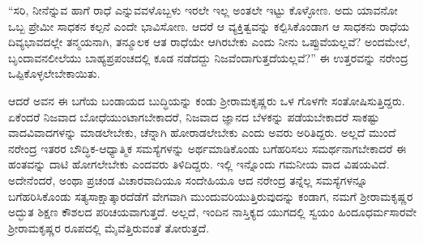 “ಸರಿ, ನೀನೆನ್ನುವ ಹಾಗೆ ರಾಧೆ ಎನ್ನುವವಳೊಬ್ಬಳು ಇರಲೇ ಇಲ್ಲ ಅಂತಲೇ ಇಟ್ಟು ಕೊಳ್ಳೋಣ. ಅದು ಯಾವನೋ ಒಬ್ಬ ಪ್ರೇಮೀ ಸಾಧಕನ ಕಲ್ಪನೆ ಎಂದೇ ಭಾವಿಸೋಣ. ಆದರೆ ಆ ವ್ಯಕ್ತಿತ್ವವನ್ನು ಕಲ್ಪಿಸಿಕೊಂಡಾಗ ಆ ಸಾಧಕನು ರಾಧೆಯ ದಿವ್ಯಭಾವದಲ್ಲೇ ತನ್ಮಯನಾಗಿ, ತನ್ಮೂಲಕ ಆತ ರಾಧೆಯೇ ಆಗಿರಬೇಕು ಎಂದು ನೀನು ಒಪ್ಪುವೆಯಲ್ಲವೆ? ಅಂದಮೇಲೆ, ಬೃಂದಾವನಲೀಲೆಯು ಬಾಹ್ಯಪ್ರಪಂಚದಲ್ಲಿ ಕೂಡ ನಡೆದದ್ದು ನಿಜವೆಂದಾಗುತ್ತದೆಯಲ್ಲವೆ?” ಈ ಉತ್ತರವನ್ನು ನರೇಂದ್ರ ಒಪ್ಪಿಕೊಳ್ಳಲೇಬೇಕಾಯಿತು.

ಆದರೆ ಅವನ ಈ ಬಗೆಯ ಬಂಡಾಯದ ಬುದ್ಧಿಯನ್ನು ಕಂಡು ಶ್ರೀರಾಮಕೃಷ್ಣರು ಒಳ ಗೊಳಗೇ ಸಂತೋಷಿಸುತ್ತಿದ್ದರು. ಏಕೆಂದರೆ ನಿಜವಾದ ಬೋಧೆಯುಂಟಾಗಬೇಕಾದರೆ, ನಿಜವಾದ ಜ್ಞಾನದ ಬೆಳಕನ್ನು ಪಡೆಯಬೇಕಾದರೆ ಸಾಕಷ್ಟು ವಾದವಿವಾದಗಳನ್ನು ಮಾಡಲೇಬೇಕು, ಚೆನ್ನಾಗಿ ಹೋರಾಡಲೇಬೇಕು ಎಂದು ಅವರು ಅರಿತಿದ್ದರು. ಅಲ್ಲದೆ ಮುಂದೆ ನರೇಂದ್ರ ಇತರರ ಬೌದ್ಧಿಕ-ಆಧ್ಯಾತ್ಮಿಕ ಸಮಸ್ಯೆಗಳನ್ನು ಅರ್ಥಮಾಡಿಕೊಂಡು ಬಗೆಹರಿಸಲು ಸಮರ್ಥನಾಗಬೇಕಾದರೆ ಈ ಹಂತವನ್ನು ದಾಟಿ ಹೋಗಲೇಬೇಕು ಎಂದವರು ತಿಳಿದಿದ್ದರು. ಇಲ್ಲಿ ಇನ್ನೊಂದು ಗಮನೀಯ ವಾದ ವಿಷಯವಿದೆ. ಅದೇನೆಂದರೆ, ಅಂಥಾ ಪ್ರಚಂಡ ವಿಚಾರವಾದಿಯೂ ಸಂದೇಹಿಯೂ ಆದ ನರೇಂದ್ರ ತನ್ನೆಲ್ಲ ಸಮಸ್ಯೆಗಳನ್ನೂ ಬಗೆಹರಿಸಿಕೊಂಡು ಸತ್ಯಸಾಕ್ಷಾತ್ಕಾರದೆಡೆಗೆ ವೇಗವಾಗಿ ಮುಂದುವರಿಯುತ್ತಿರುವುದನ್ನು ಕಂಡಾಗ, ನಮಗೆ ಶ್ರೀರಾಮಕೃಷ್ಣರ ಅದ್ಭುತ ಶಿಕ್ಷಣ ಕೌಶಲದ ಪರಿಚಯವಾಗುತ್ತದೆ. ಅಲ್ಲದೆ, ಇಂದಿನ ನಾಸ್ತಿಕ್ಯದ ಯುಗದಲ್ಲಿ ಸ್ವಯಂ ಹಿಂದೂಧರ್ಮಸಾರವೇ ಶ್ರೀರಾಮಕೃಷ್ಣರ ರೂಪದಲ್ಲಿ ಮೈವೆತ್ತಿರುವಂತೆ ತೋರುತ್ತದೆ.

